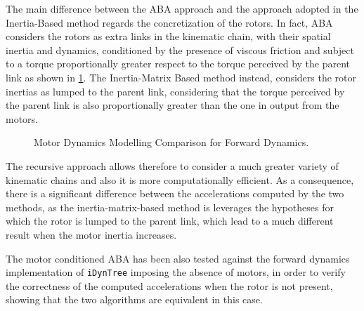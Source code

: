 The main difference between the \ac{ABA} approach and the approach adopted in the Inertia-Based method regards the concretization of the rotors. In fact, \ac{ABA} considers the rotors as extra links in the kinematic chain, with their spatial inertia and dynamics, conditioned by the presence of viscous friction and subject to a torque proportionally greater respect to the torque perceived by the parent link as shown in \cref{fig:ABA_comparison}. The Inertia-Matrix Based method instead, considers the rotor inertias as lumped to the parent link, considering that the torque perceived by the parent link is also proportionally greater than the one in output from the motors.

\begin{figure}
    \centering
    \caption{Motor Dynamics Modelling Comparison for Forward Dynamics.}
    \label{fig:ABA_comparison}
    \subfloat[ABA]{
        \resizebox{0.5\textwidth}{!}{
            
        }}
\end{figure}

The recursive approach allows therefore to consider a much greater variety of kinematic chains and also it is more computationally efficient. As a consequence, there is a significant difference between the accelerations computed by the two methods, as the inertia-matrix-based method is leverages the hypotheses for which the rotor is lumped to the parent link, which lead to a much different result when the motor inertia increases.

The motor conditioned ABA has been also tested against the forward dynamics implementation of \texttt{iDynTree} \citep{10.3389/frobt.2015.00006} imposing the absence of motors, in order to verify the correctness of the computed accelerations when the rotor is not present, showing that the two algorithms are equivalent in this case.
